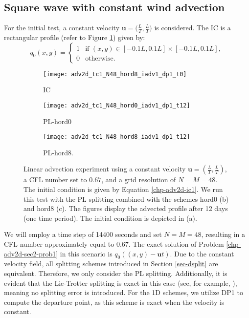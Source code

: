 \subsection{Square wave with constant wind advection}
For the initial test, a constant velocity $\boldsymbol{u}=\big(\frac{L}{T},\frac{L}{T}\big)$ is considered.
The IC is a rectangular profile (refer to Figure \ref{chp-adv2d-sec-exp-adv1-a}) given by:
\begin{equation}
	\label{chp-adv2d-ic1}
	q_0(x,y) =  
	\begin{cases}
		1 & \text{if } (x,y) \in [-0.1L,0.1L]\times [-0.1L,0.1L],\\
		0 & \text{otherwise}.
	\end{cases}
\end{equation}
\begin{figure}[!htb]
	\centering
	\begin{subfigure}{0.3\textwidth}
		\centering
		\texttt{[image: adv2d\_tc1\_N48\_hord8\_iadv1\_dp1\_t0]}
		\caption{IC\label{chp-adv2d-sec-exp-adv1-a}}
	\end{subfigure}
	\begin{subfigure}{0.3\textwidth}
		\centering
		\texttt{[image: adv2d\_tc1\_N48\_hord0\_iadv1\_dp1\_t12]}
		\caption{PL-hord0\label{chp-adv2d-sec-exp-adv1-b}}
	\end{subfigure}
	\begin{subfigure}{0.3\textwidth}
		\centering
		\texttt{[image: adv2d\_tc1\_N48\_hord8\_iadv1\_dp1\_t12]}
		\caption{PL-hord8.\label{chp-adv2d-sec-exp-adv1-c}}
	\end{subfigure}	
	\caption{Linear advection experiment using a constant velocity $\boldsymbol{u} = \left(\frac{L}{T},\frac{L}{T}\right)$, 
	a CFL number set to $0.67$, and a grid resolution of $N=M=48$.
	The initial condition is given by Equation \eqref{chp-adv2d-ic1}.
	We run this test with the PL splitting combined with the schemes hord0 (b) and hord8 (c).
        The figures display the advected profile after 12 days (one time period).
        The initial condition is depicted in (a). \label{chp-adv2d-sec-exp-adv1}}
\end{figure}

We will employ a time step of 14400 seconds and set $N=M=48$, resulting in a CFL number approximately equal to 0.67.
The exact solution of Problem \ref{chp-adv2d-sec2-prob1} in this scenario is $q_0((x,y)-\boldsymbol{u}t)$.
Due to the constant velocity field, all splitting schemes introduced in Section \ref{sec-dsplit} are equivalent.
Therefore, we only consider the PL splitting. Additionally, it is evident that the Lie-Trotter splitting is exact in this case 
(see, for example, \cite[p.~202-203]{leveque:1990}), meaning no splitting error is introduced.
For the 1D schemes, we utilize DP1 to compute the departure point, as this scheme is exact when the velocity is constant.

